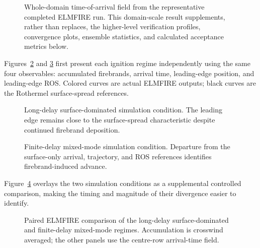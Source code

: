 \begin{figure}[H]
\centering
{}
\caption{Whole-domain time-of-arrival field from the representative completed ELMFIRE run.  This
domain-scale result supplements, rather than replaces, the higher-level verification
profiles, convergence plots, ensemble statistics, and calculated acceptance metrics below.}
\label{fig:domain-result}
\end{figure}

Figures~\ref{fig:surface-dominated-reference} and
\ref{fig:mixed-mode-reference} first present each ignition regime independently
using the same four observables: accumulated firebrands, arrival time,
leading-edge position, and leading-edge ROS. Colored curves are actual ELMFIRE
outputs; black curves are the Rothermel surface-spread references.

\begin{figure}[H]
\centering
{}
\caption{Long-delay surface-dominated simulation condition. The leading edge remains close
to the surface-spread characteristic despite continued firebrand deposition.}
\label{fig:surface-dominated-reference}
\end{figure}

\begin{figure}[H]
\centering
{}
\caption{Finite-delay mixed-mode simulation condition. Departure from the surface-only
arrival, trajectory, and ROS references identifies firebrand-induced advance.}
\label{fig:mixed-mode-reference}
\end{figure}

Figure~\ref{fig:delay-effect} overlays the two simulation conditions as a supplemental
controlled comparison, making the timing and magnitude of their divergence
easier to identify.

\begin{figure}[H]
\centering
{}
\caption{Paired ELMFIRE comparison of the long-delay surface-dominated and
finite-delay mixed-mode regimes. Accumulation is crosswind averaged; the other
panels use the centre-row arrival-time field.}
\label{fig:delay-effect}
\end{figure}
\FloatBarrier


